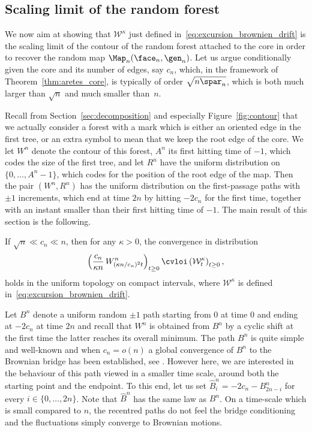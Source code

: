 \subsection{Scaling limit of the random forest}

We now aim at showing that $\mathcal{W}^\kappa$ just defined in~\eqref{eq:excursion_brownien_drift} is the scaling limit of the contour of the random forest attached to the core in order to recover the random map $\Map_n(\face_n, \gen_n)$.
Let us argue conditionally given the core and its number of edges, say $c_n$, which, in the framework of Theorem~\ref{thm:aretes_core}, is typically of order $\sqrt{n \spar_n}$, which is both much larger than $\sqrt{n}$ and much smaller than~$n$.

Recall from Section~\ref{sec:decomposition} and especially Figure~\ref{fig:contour} that we actually consider a forest with a mark which is either an oriented edge in the first tree, or an extra symbol to mean that we keep the root edge of the core. We let $W^n$ denote the contour of this forest, $A^n$ its first hitting time of $-1$, which codes the size of the first tree, and let $R^n$ have the uniform distribution on $\{0, \dots, A^n-1\}$, which codes for the position of the root edge of the map. Then the pair $(W^n, R^n)$ has the uniform distribution on the first-passage paths with $\pm1$ increments, which end at time $2n$ by hitting $-2c_n$ for the first time, together with an instant smaller than their first hitting time of $-1$.
The main result of this section is the following.

\begin{proposition}\label{prop:cv_contour_brownien_drift}
If $\sqrt{n} \ll c_n \ll n$, then for any $\kappa >0$, the convergence in distribution
\[
\left(\frac{c_{n}}{\kappa n}\, W^{n}_{(\kappa n/c_{n})^2 t}\right)_{t \ge 0}
\cvloi \left(\mathcal{W}^{\kappa}_{t}\right)_{t \ge 0},
\]
holds in the uniform topology on compact intervals, where $\mathcal{W}^\kappa$ is defined in~\eqref{eq:excursion_brownien_drift}.
\end{proposition}

Let $B^n$ denote a uniform random $\pm1$ path starting from $0$ at time $0$ and ending at $-2c_n$ at time $2n$ and recall that $W^n$ is obtained from $B^n$ by a cyclic shift at the first time the latter reaches its overall minimum.
The path $B^n$ is quite simple and well-known and when $c_n=o(n)$ a global convergence of $B^n$ to the Brownian bridge has been established, see \eg \cite[Th.\,20.7]{Ald85}.
However here, we are interested in the behaviour of this path viewed in a smaller time scale, around both the starting point and the endpoint. To this end, let us set $\widehat{B}^{n}_{i} = -2c_{n}-B^{n}_{2n-i}$ for every $i \in \{0, \dots, 2n\}$. Note that $\widehat{B}^{n}$ has the same law as $B^{n}$.
On a time-scale which is small compared to $n$, the recentred paths do not feel the bridge conditioning and the fluctuations simply converge to Brownian motions.

